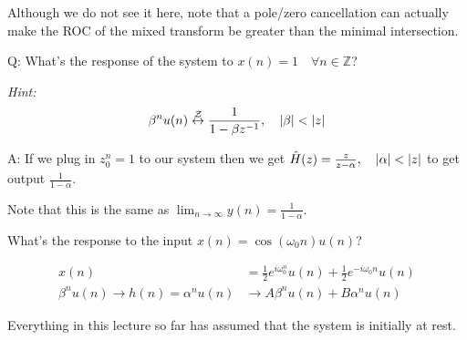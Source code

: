 Although we do not see it here, note that a pole/zero cancellation can actually make the ROC of the mixed transform be greater than the minimal intersection.

\begin{shaded}
Q: What's the response of the system to $x(n)=1\quad\forall n\in\mathbb Z$?
\end{shaded}
\textit{Hint:}\[
\beta_{}^n u(n) \zt \frac{1}{1-\beta z^{-1}}, \quad|\beta|<|z|
\]

A: If we plug in $z_0^n=1$ to our system then we get $\Hhat =\frac{z}{z-\alpha},\quad|\alpha|<|z|$ to get output $\frac{1}{1-\alpha}$.

Note that this is the same as $\displaystyle\lim_{n\to\infty} y(n) = \frac{1}{1-\alpha}$.

\hrulefill

\begin{shaded}
What's the response to the input $x(n)=\cos(\omega_0 n)u(n)$?
\end{shaded}
\begin{align*}
    x(n) 
    &=\frac{1}{2} e^{i \omega_0^n} u(n)+\frac{1}{2} e^{-i \omega_0 n} u(n) \\
    \beta^n u(n) \rightarrow \boxed{h(n)=\alpha^n u(n)}& \rightarrow {A \beta^n u(n)}+{B \alpha^n u(n)}
\end{align*}

Everything in this lecture so far has assumed that the system is initially at rest.

\hrulefill

